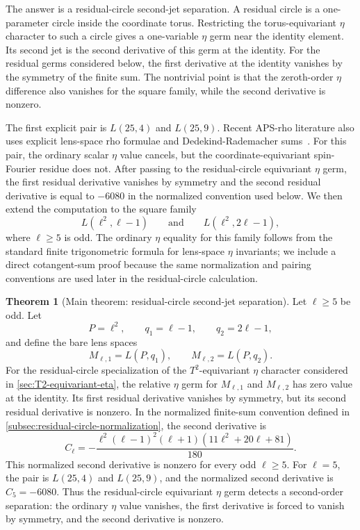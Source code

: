 \documentclass{article}
\theoremstyle{definition}
\newtheorem{theorem}{Theorem}[section]
\numberwithin{equation}{section}
\begin{document}
The answer is a residual-circle second-jet separation.  A residual circle is a one-parameter circle inside the coordinate torus.  Restricting the torus-equivariant $\eta$ character to such a circle gives a one-variable $\eta$ germ near the identity element.  Its second jet is the second derivative of this germ at the identity.  For the residual germs considered below, the first derivative at the identity vanishes by the symmetry of the finite sum.  The nontrivial point is that the zeroth-order $\eta$ difference also vanishes for the square family, while the second derivative is nonzero.

The first explicit pair is $L(25,4)$ and $L(25,9)$.  Recent APS-rho literature also uses explicit lens-space rho formulae and Dedekind-Rademacher sums~\cite{ToffoliAPSRhoLinks}.  For this pair, the ordinary scalar $\eta$ value cancels, but the coordinate-equivariant spin-Fourier residue does not.  After passing to the residual-circle equivariant $\eta$ germ, the first residual derivative vanishes by symmetry and the second residual derivative is equal to $-6080$ in the normalized convention used below.  We then extend the computation to the square family
\begin{equation}
L(\ell^2,\ell-1)
\qquad\text{and}\qquad
L(\ell^2,2\ell-1),
\end{equation}
where $\ell\geq 5$ is odd.  The ordinary $\eta$ equality for this family follows from the standard finite trigonometric formula for lens-space $\eta$ invariants; we include a direct cotangent-sum proof because the same normalization and pairing conventions are used later in the residual-circle calculation.

\begin{theorem}[Main theorem: residual-circle second-jet separation]
\label{thm:main-residual-circle-second-jet}
Let $\ell\geq 5$ be odd.  Let
\begin{equation}
P=\ell^2,
\qquad
q_1=\ell-1,
\qquad
q_2=2\ell-1,
\end{equation}
and define the bare lens spaces
\begin{equation}
M_{\ell,1}=L(P,q_1),
\qquad
M_{\ell,2}=L(P,q_2).
\end{equation}
For the residual-circle specialization of the $T^2$-equivariant $\eta$ character considered in \autoref{sec:T2-equivariant-eta}, the relative $\eta$ germ for $M_{\ell,1}$ and $M_{\ell,2}$ has zero value at the identity.  Its first residual derivative vanishes by symmetry, but its second residual derivative is nonzero.  In the normalized finite-sum convention defined in \autoref{subsec:residual-circle-normalization}, the second derivative is
\begin{equation}
C_\ell
=
-\frac{\ell^2(\ell-1)^2(\ell+1)(11\ell^2+20\ell+81)}{180}.
\end{equation}
This normalized second derivative is nonzero for every odd $\ell\geq 5$.  For $\ell=5$, the pair is $L(25,4)$ and $L(25,9)$, and the normalized second derivative is $C_5=-6080$.  Thus the residual-circle equivariant $\eta$ germ detects a second-order separation: the ordinary $\eta$ value vanishes, the first derivative is forced to vanish by symmetry, and the second derivative is nonzero.
\end{theorem}
\end{document}
